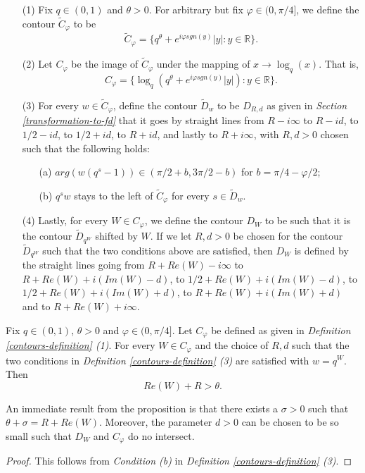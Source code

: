 \begin{definition}
\label{contours-definition}
\begin{enumerate}
\item[(1)] Fix $q \in (0,1)$ and $\theta > 0$. For arbitrary but fix $\varphi \in (0, \pi / 4]$, we define the contour $\tilde{C}_{\varphi}$ to be $$\tilde{C}_{\varphi} = \{q^{\theta} + e^{i\varphi sgn(y)} |y|: y \in \mathbb{R}\}.$$ 
\item[(2)] Let $C_{\varphi}$ be the image of $\tilde{C}_{\varphi}$ under the mapping of $x \rightarrow \log_q(x)$. That is, $$C_{\varphi} = \{\log_q (q^{\theta} + e^{i\varphi sgn(y)} |y|) : y \in \mathbb{R}\}.$$
\item[(3)] For every $w \in \tilde{C}_{\varphi}$, define the contour $\tilde{D}_{w}$ to be $D_{R,d}$ as given in \textit{Section \ref{transformation-to-fd}} that it goes by straight lines from $R - i\infty$ to $R - id$, to $1/2 - id$, to $1/2 + id$, to $R + id$, and lastly to $R+i\infty$, with $R, d>0$ chosen such that the following holds:
\begin{enumerate}
\item[(a)] $arg(w(q^s-1)) \in (\pi / 2+b, 3\pi / 2 - b)$ for $b = \pi / 4 - \varphi / 2$;
\item[(b)] $q^sw$ stays to the left of $\tilde{C}_{\varphi}$ for every $s \in \tilde{D}_{w}$.
\end{enumerate}
\item[(4)] Lastly, for every $W \in C_{\varphi}$, we define the contour $D_W$ to be such that it is the contour $\tilde{D}_{q^W}$ shifted by $W$. If we let $R,d > 0$ be chosen for the contour $\tilde{D}_{q^W}$ such that the two conditions above are satisfied, then $D_W$ is defined by the straight lines going from $R+Re(W)-i \infty$ to $R+Re(W) + i(Im(W) - d)$, to $1/2+Re(W) + i(Im(W) - d)$, to $1/2 + Re(W) + i(Im(W) + d)$, to $R+Re(W) + i(Im(W) + d)$ and to $R+Re(W) + i \infty$.
\end{enumerate}
\end{definition}

\begin{proposition}
Fix $q \in (0,1)$, $\theta > 0$ and $\varphi \in (0, \pi / 4]$. Let $C_{\varphi}$ be defined as given in \textit{Definition \ref{contours-definition} (1)}. For every $W \in C_{\varphi}$ and the choice of $R, d$ such that the two conditions in \textit{Definition \ref{contours-definition} (3)} are satisfied with $w = q^W$. Then $$Re(W) + R > \theta.$$
\end{proposition}
\begin{remark}
An immediate result from the proposition is that there exists a $\sigma > 0$ such that $\theta + \sigma = R + Re(W)$. Moreover, the parameter $d > 0$ can be chosen to be so small such that $D_W$ and $C_{\varphi}$ do no intersect.
\end{remark}
\begin{proof}
This follows from \textit{Condition (b)} in \textit{Definition \ref{contours-definition} (3)}.
\end{proof}

